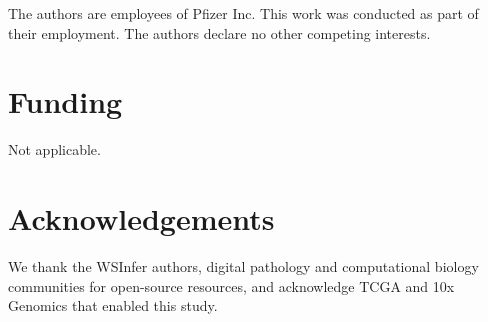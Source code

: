 \documentclass[sn-mathphys-num]{sn-jnl}%
\theoremstyle{thmstyleone}%
\theoremstyle{thmstyletwo}%
\theoremstyle{thmstylethree}%
\begin{document}
	The authors are employees of Pfizer Inc. This work was conducted as part of their employment. The authors declare no other competing interests.
	
	\section{Funding}
	
	Not applicable.
	
	\section{Acknowledgements}
	
	We thank the WSInfer authors, digital pathology and computational biology communities for open-source resources, and acknowledge TCGA and 10x Genomics that enabled this study.
	
	
	
\end{document}
